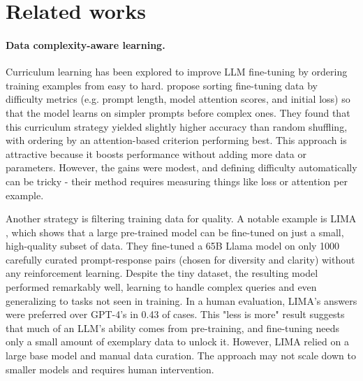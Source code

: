 \section{Related works}




\paragraph{Data complexity-aware learning.}
Curriculum learning has been explored to improve LLM fine-tuning by ordering training examples from easy to hard. \citet{kim2024strategic} propose sorting fine-tuning data by difficulty metrics (e.g. prompt length, model attention scores, and initial loss) so that the model learns on simpler prompts before complex ones. They found that this curriculum strategy yielded slightly higher accuracy than random shuffling, with ordering by an attention-based criterion performing best. This approach is attractive because it boosts performance without adding more data or parameters. However, the gains were modest, and defining difficulty automatically can be tricky - their method requires measuring things like loss or attention per example. 

Another strategy is filtering training data for quality. A notable example is LIMA \cite{zhou2023lima}, which shows that a large pre-trained model can be fine-tuned on just a small, high-quality subset of data. They fine-tuned a 65B Llama model on only 1000 carefully curated prompt-response pairs (chosen for diversity and clarity) without any reinforcement learning. Despite the tiny dataset, the resulting model performed remarkably well, learning to handle complex queries and even generalizing to tasks not seen in training. In a human evaluation, LIMA's answers were preferred over GPT-4's in 0.43 of cases. This "less is more" result suggests that much of an LLM's ability comes from pre-training, and fine-tuning needs only a small amount of exemplary data to unlock it. However, LIMA relied on a large base model and manual data curation. The approach may not scale down to smaller models and requires human intervention.

